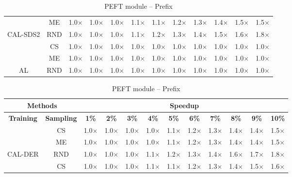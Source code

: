 \begin{table}[htbp]
\begin{subtable}{\linewidth}
\begin{tabular}{c|c|cccccccccc}
 & ME & 1.0$\times$ & 1.0$\times$ & 1.0$\times$ & 1.1$\times$ & 1.1$\times$ & 1.2$\times$ & 1.3$\times$ & 1.4$\times$ & 1.5$\times$ & 1.5$\times$\\

\multirow{-3}{*}{\raggedright\arraybackslash CAL-SDS2} & RND & 1.0$\times$ & 1.0$\times$ & 1.0$\times$ & 1.1$\times$ & 1.2$\times$ & 1.3$\times$ & 1.4$\times$ & 1.5$\times$ & 1.6$\times$ & 1.8$\times$\\
\midrule
 & CS & 1.0$\times$ & 1.0$\times$ & 1.0$\times$ & 1.0$\times$ & 1.0$\times$ & 1.0$\times$ & 1.0$\times$ & 1.0$\times$ & 1.0$\times$ & 1.0$\times$\\

 & ME & 1.0$\times$ & 1.0$\times$ & 1.0$\times$ & 1.0$\times$ & 1.0$\times$ & 1.0$\times$ & 1.0$\times$ & 1.0$\times$ & 1.0$\times$ & 1.0$\times$\\

\multirow{-3}{*}{\raggedright\arraybackslash AL} & RND & 1.0$\times$ & 1.0$\times$ & 1.0$\times$ & 1.0$\times$ & 1.0$\times$ & 1.0$\times$ & 1.0$\times$ & 1.0$\times$ & 1.0$\times$ & 1.0$\times$\\
\bottomrule
\end{tabular}
\end{subtable}
\vspace{1em}
\begin{subtable}{\linewidth}
\centering
\caption{PEFT module -- Prefix}

\begin{tabular}{c|c|cccccccccc}
\toprule
\multicolumn{2}{c|}{\textbf{Methods}} & \multicolumn{10}{c}{\textbf{Speedup}} \\
\midrule
\textbf{Training} & \textbf{Sampling} & \textbf{1\%} & \textbf{2\%} & \textbf{3\%} & \textbf{4\%} & \textbf{5\%} & \textbf{6\%} & \textbf{7\%} & \textbf{8\%} & \textbf{9\%} & \textbf{10\%}\\
\midrule
 & CS & 1.0$\times$ & 1.0$\times$ & 1.0$\times$ & 1.0$\times$ & 1.1$\times$ & 1.2$\times$ & 1.3$\times$ & 1.4$\times$ & 1.4$\times$ & 1.5$\times$\\

 & ME & 1.0$\times$ & 1.0$\times$ & 1.0$\times$ & 1.0$\times$ & 1.1$\times$ & 1.2$\times$ & 1.3$\times$ & 1.4$\times$ & 1.4$\times$ & 1.5$\times$\\

\multirow{-3}{*}{\raggedright\arraybackslash CAL-DER} & RND & 1.0$\times$ & 1.0$\times$ & 1.0$\times$ & 1.1$\times$ & 1.2$\times$ & 1.3$\times$ & 1.4$\times$ & 1.6$\times$ & 1.7$\times$ & 1.8$\times$\\
\midrule
 & CS & 1.0$\times$ & 1.0$\times$ & 1.0$\times$ & 1.1$\times$ & 1.1$\times$ & 1.2$\times$ & 1.3$\times$ & 1.4$\times$ & 1.5$\times$ & 1.6$\times$\\


\end{tabular}
\end{subtable}
\end{table}
